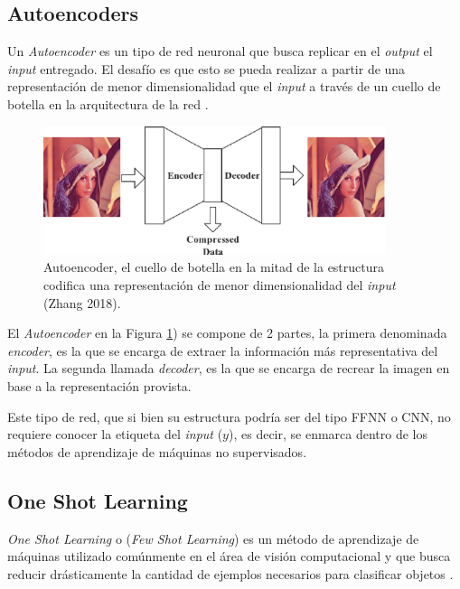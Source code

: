 \subsection{Autoencoders}

Un \textit{Autoencoder} es un tipo de red neuronal que busca replicar en el \textit{output} el \textit{input} entregado. El desafío es que esto se pueda realizar a partir de una representación de menor dimensionalidad que el \textit{input} a través de un cuello de botella en la arquitectura de la red \cite{Zhang2018ABA}.


\begin{figure}[ht]
    \centering
    \includegraphics[width=10cm]{img/tesis/autoencoder.png}
    \caption{Autoencoder, el cuello de botella en la mitad de la estructura codifica una representación de menor dimensionalidad del \textit{input} (Zhang 2018).}
    \label{fig:autoencoder}
\end{figure}

El \textit{Autoencoder} en la Figura \ref{fig:autoencoder}) se compone de 2 partes, la primera denominada \textit{encoder}, es la que se encarga de extraer la información más representativa del \textit{input}. La segunda llamada \textit{decoder}, es la que se encarga de recrear la imagen en base a la representación provista. 

\vspace{0.2cm}

Este tipo de red, que si bien su estructura podría ser del tipo FFNN o CNN, no requiere conocer la etiqueta del \textit{input} ($y$), es decir, se enmarca dentro de los métodos de aprendizaje de máquinas no supervisados. 

\subsection{One Shot Learning}

\textit{One Shot Learning} o (\textit{Few Shot Learning}) es un método de aprendizaje de máquinas utilizado comúnmente en el área de visión computacional y que busca reducir drásticamente la cantidad de ejemplos necesarios para clasificar objetos \cite{OMAHONY2019186}.

